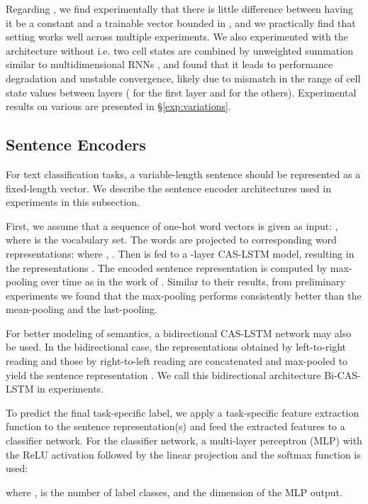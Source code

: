 \documentclass[wcp]{jmlr}
\begin{document}
    Regarding , we find experimentally that there is little difference between having it be a constant and a trainable vector bounded in , and we practically find that setting  works well across multiple experiments.
    We also experimented with the architecture without  i.e. two cell states are combined by unweighted summation similar to multidimensional RNNs \citep{graves2009offline}, and found that it leads to performance degradation and unstable convergence, likely due to mismatch in the range of cell state values between layers ( for the first layer and  for the others).
    Experimental results on various  are presented in \S\ref{exp:variations}.
    
    
    
    \subsection{Sentence Encoders}
    For text classification tasks, a variable-length sentence should be represented as a fixed-length vector.
    We describe the sentence encoder architectures used in experiments in this subsection.
    
    First, we assume that a sequence of  one-hot word vectors is given as input: ,  where  is the vocabulary set.
    The words are projected to corresponding word representations:  where , .
    Then  is fed to a -layer CAS-LSTM model, resulting in the representations .
    The encoded sentence representation  is computed by max-pooling  over time as in the work of \citet{conneau2017infersent}.
    Similar to their results, from preliminary experiments we found that the max-pooling performs consistently better than the mean-pooling and the last-pooling.
    
    For better modeling of semantics, a bidirectional CAS-LSTM network may also be used.
    In the bidirectional case, the representations obtained by left-to-right reading 
    and those by right-to-left reading  are concatenated and max-pooled to yield the sentence representation .
    We call this bidirectional architecture Bi-CAS-LSTM in experiments.
    
    To predict the final task-specific label, we apply a task-specific feature extraction function  to the sentence representation(s) and feed the extracted features to a classifier network.
    For the classifier network, a multi-layer perceptron (MLP) with the ReLU activation followed by the linear projection and the softmax function is used:
    
    where ,  is the number of label classes, and  the dimension of the MLP output.
    
\end{document}
